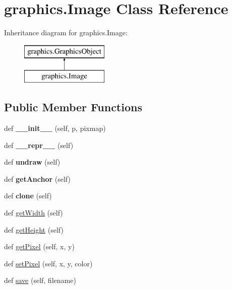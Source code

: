 \hypertarget{classgraphics_1_1_image}{}\section{graphics.\+Image Class Reference}
\label{classgraphics_1_1_image}
Inheritance diagram for graphics.\+Image\+:\begin{figure}[H]
\begin{center}
\leavevmode
\includegraphics[height=2.000000cm]{classgraphics_1_1_image}
\end{center}
\end{figure}
\subsection*{Public Member Functions}
\begin{DoxyCompactItemize}
\item 
\mbox{\label{classgraphics_1_1_image_a0e82c34ead99ecc7e8bd19f8d073c135}} 
def {\bfseries \+\_\+\+\_\+init\+\_\+\+\_\+} (self, p, pixmap)
\item 
\mbox{\label{classgraphics_1_1_image_a6dc7689939ebef91fbce7ff60b190a32}} 
def {\bfseries \+\_\+\+\_\+repr\+\_\+\+\_\+} (self)
\item 
\mbox{\label{classgraphics_1_1_image_a012595b97cd10d26b7fa2f0f0460d169}} 
def {\bfseries undraw} (self)
\item 
\mbox{\label{classgraphics_1_1_image_a7f5afb0cad91db822c5074255eb53f04}} 
def {\bfseries get\+Anchor} (self)
\item 
\mbox{\label{classgraphics_1_1_image_a4ade7cc782c157e45fa9b516fe6a3a98}} 
def {\bfseries clone} (self)
\item 
def \hyperlink{classgraphics_1_1_image_aff8e62ceeb4265e4d17ce852903c9ae3}{get\+Width} (self)
\item 
def \hyperlink{classgraphics_1_1_image_ab092ccc35755f176309971023f912d67}{get\+Height} (self)
\item 
def \hyperlink{classgraphics_1_1_image_a69deca3f65e378be239eb1ba837d06f8}{get\+Pixel} (self, x, y)
\item 
def \hyperlink{classgraphics_1_1_image_a73fb3ce4de03fe9f57c076d739712378}{set\+Pixel} (self, x, y, color)
\item 
def \hyperlink{classgraphics_1_1_image_ace518e9286a3bc0f81c7f1029c394104}{save} (self, filename)
\end{DoxyCompactItemize}
